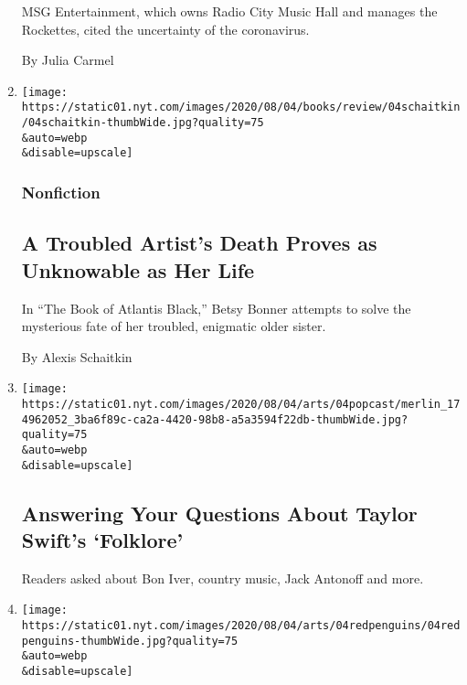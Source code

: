 \begin{enumerate}
  MSG Entertainment, which owns Radio City Music Hall and manages the
  Rockettes, cited the uncertainty of the coronavirus.

  By Julia Carmel
\item
  \href{/2020/08/04/books/review/betsy-bonner-the-book-of-atlantis-black.html}{}

  \texttt{[image: https://static01.nyt.com/images/2020/08/04/books/review/04schaitkin/04schaitkin-thumbWide.jpg?quality=75\\\&auto=webp\\\&disable=upscale]}

  \hypertarget{nonfiction}{%
  \subsubsection{Nonfiction}\label{nonfiction}}

  \hypertarget{a-troubled-artists-death-proves-as-unknowable-as-her-life}{%
  \subsection{A Troubled Artist's Death Proves as Unknowable as Her
  Life}\label{a-troubled-artists-death-proves-as-unknowable-as-her-life}}

  In ``The Book of Atlantis Black,'' Betsy Bonner attempts to solve the
  mysterious fate of her troubled, enigmatic older sister.

  By Alexis Schaitkin
\item
  \href{/2020/08/04/arts/music/taylor-swift-folklore-questions.html}{}

  \texttt{[image: https://static01.nyt.com/images/2020/08/04/arts/04popcast/merlin\_174962052\_3ba6f89c-ca2a-4420-98b8-a5a3594f22db-thumbWide.jpg?quality=75\\\&auto=webp\\\&disable=upscale]}

  \hypertarget{answering-your-questions-about-taylor-swifts-folklore}{%
  \subsection{Answering Your Questions About Taylor Swift's
  `Folklore'}\label{answering-your-questions-about-taylor-swifts-folklore}}

  Readers asked about Bon Iver, country music, Jack Antonoff and more.
\item
  \href{/2020/08/04/movies/red-penguins-review.html}{}

  \texttt{[image: https://static01.nyt.com/images/2020/08/04/arts/04redpenguins/04redpenguins-thumbWide.jpg?quality=75\\\&auto=webp\\\&disable=upscale]}


\end{enumerate}
